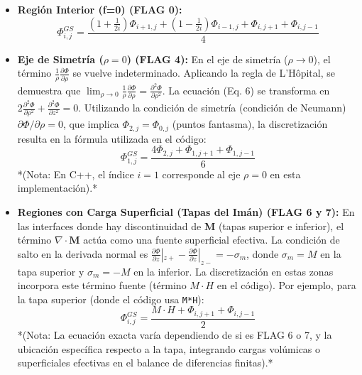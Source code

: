 \begin{itemize}
    \item \textbf{Región Interior (f=0) (FLAG 0):}
    \begin{equation}
        \Phi_{i,j}^{GS} = \frac{\left(1 + \frac{1}{2i}\right)\Phi_{i+1,j} + \left(1 - \frac{1}{2i}\right)\Phi_{i-1,j} + \Phi_{i,j+1} + \Phi_{i,j-1}}{4}
    \end{equation}
    
    \item \textbf{Eje de Simetría ($\rho=0$) (FLAG 4):}
    En el eje de simetría ($\rho \to 0$), el término $\frac{1}{\rho}\frac{\partial \Phi}{\partial \rho}$ se vuelve indeterminado. Aplicando la regla de L'Hôpital, se demuestra que $\lim_{\rho \to 0} \frac{1}{\rho}\frac{\partial \Phi}{\partial \rho} = \frac{\partial^2 \Phi}{\partial \rho^2}$. La ecuación (Eq. 6) se transforma en $2\frac{\partial^2 \Phi}{\partial \rho^2} + \frac{\partial^2 \Phi}{\partial z^2} = 0$. Utilizando la condición de simetría (condición de Neumann) $\partial\Phi/\partial\rho = 0$, que implica $\Phi_{2,j} = \Phi_{0,j}$ (puntos fantasma), la discretización resulta en la fórmula utilizada en el código:
    \begin{equation}
        \Phi_{1,j}^{GS} = \frac{4\Phi_{2,j} + \Phi_{1,j+1} + \Phi_{1,j-1}}{6}
    \end{equation}
    *(Nota: En C++, el índice $i=1$ corresponde al eje $\rho=0$ en esta implementación).*

    \item \textbf{Regiones con Carga Superficial (Tapas del Imán) (FLAG 6 y 7):}
    En las interfaces donde hay discontinuidad de $\mathbf{M}$ (tapas superior e inferior), el término $\nabla \cdot \mathbf{M}$ actúa como una fuente superficial efectiva. La condición de salto en la derivada normal es $\frac{\partial\Phi}{\partial z}|_{z+} - \frac{\partial\Phi}{\partial z}|_{z-} = -\sigma_m$, donde $\sigma_m = M$ en la tapa superior y $\sigma_m = -M$ en la inferior. La discretización en estas zonas incorpora este término fuente (término $M\cdot H$ en el código). Por ejemplo, para la tapa superior (donde el código usa \texttt{M*H}):
    \begin{equation}
        \Phi_{i,j}^{GS} = \frac{M\cdot H + \Phi_{i,j+1} + \Phi_{i,j-1}}{2}
    \end{equation}
    *(Nota: La ecuación exacta varía dependiendo de si es FLAG 6 o 7, y la ubicación específica respecto a la tapa, integrando cargas volúmicas o superficiales efectivas en el balance de diferencias finitas).*
\end{itemize}


